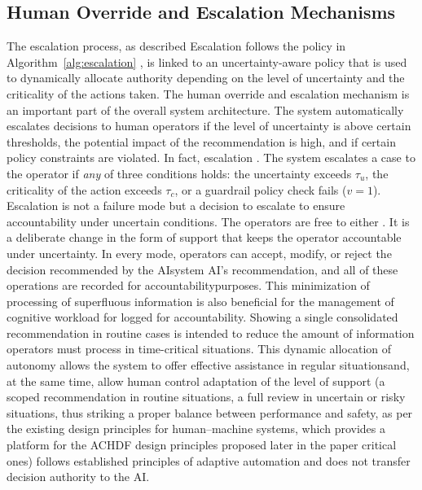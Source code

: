 \documentclass[journal]{IEEEtran}
\theoremstyle{plain}
\theoremstyle{definition}
\providecommand{\DIFaddtex}[1]{{\protect\color{blue} \sf #1}} %
\providecommand{\DIFdeltex}[1]{{\protect\color{red} \scriptsize #1}} %
\providecommand{\DIFaddbegin}{} %
\providecommand{\DIFaddend}{} %
\providecommand{\DIFdelbegin}{} %
\providecommand{\DIFdelend}{} %
\providecommand{\DIFadd}[1]{\texorpdfstring{\DIFaddtex{#1}}{#1}} %
\providecommand{\DIFdel}[1]{\texorpdfstring{\DIFdeltex{#1}}{}} %
\newcommand{\DIFscaledelfig}{0.5}
\newlength{\DIFdelgraphicswidth} %
\newlength{\DIFdelgraphicsheight} %
\newcommand{\DIFaddincludegraphics}[2][]{{\color{blue}\fbox{\DIFOincludegraphics[#1]{#2}}}} %
\newcommand{\DIFdelincludegraphics}[2][]{%
\sbox{\DIFdelgraphicsbox}{\DIFOincludegraphics[#1]{#2}}%
\settoboxwidth{\DIFdelgraphicswidth}{\DIFdelgraphicsbox} %
\settoboxtotalheight{\DIFdelgraphicsheight}{\DIFdelgraphicsbox} %
\scalebox{\DIFscaledelfig}{%
\parbox[b]{\DIFdelgraphicswidth}{\usebox{\DIFdelgraphicsbox}\\[-\baselineskip] \rule{\DIFdelgraphicswidth}{0em}}\llap{\resizebox{\DIFdelgraphicswidth}{\DIFdelgraphicsheight}{%
\setlength{\unitlength}{\DIFdelgraphicswidth}%
\begin{picture}(1,1)%
\thicklines\linethickness{2pt} %
{\color[rgb]{1,0,0}\put(0,0){\framebox(1,1){}}}%
{\color[rgb]{1,0,0}\put(0,0){\line( 1,1){1}}}%
{\color[rgb]{1,0,0}\put(0,1){\line(1,-1){1}}}%
\end{picture}%
}\hspace*{3pt}}} %
} %
\DeclareRobustCommand{\DIFaddbegin}{\DIFOaddbegin \let\includegraphics\DIFaddincludegraphics} %
\DeclareRobustCommand{\DIFaddend}{\DIFOaddend \let\includegraphics\DIFOincludegraphics} %
\DeclareRobustCommand{\DIFdelbegin}{\DIFOdelbegin \let\includegraphics\DIFdelincludegraphics} %
\DeclareRobustCommand{\DIFdelend}{\DIFOaddend \let\includegraphics\DIFOincludegraphics} %
\begin{document}
\subsection{Human Override and Escalation Mechanisms}
\DIFdelbegin \DIFdel{The escalation process, as described }\DIFdelend \DIFaddbegin \DIFadd{Escalation follows the policy }\DIFaddend in Algorithm~\ref{alg:escalation}\DIFdelbegin \DIFdel{, is linked to an uncertainty-aware policy that is used to dynamically allocate authority depending on the level of uncertainty and the criticality of the actions taken. The human override and escalation mechanism is an important part of the overall system architecture.
The system automatically escalates decisions to human operators if the level of uncertainty is above certain thresholds, the potential impact of the recommendation is high, and if certain policy constraints are violated. In fact, escalation }\DIFdelend \DIFaddbegin \DIFadd{. The system escalates a case to the operator if \emph{any} of three conditions holds: the uncertainty exceeds $\tau_u$, the criticality of the action exceeds $\tau_c$, or a guardrail policy check fails ($v=1$). Escalation }\DIFaddend is not a failure mode\DIFdelbegin \DIFdel{but a decision to escalate to ensure accountability under uncertain conditions.
The operators are free to either }\DIFdelend \DIFaddbegin \DIFadd{. It is a deliberate change in the form of support that keeps the operator accountable under uncertainty.
In every mode, operators can }\DIFaddend accept, modify, or reject the \DIFdelbegin \DIFdel{decision recommended by the AIsystem}\DIFdelend \DIFaddbegin \DIFadd{AI's recommendation}\DIFaddend , and all of these operations are \DIFdelbegin \DIFdel{recorded for accountabilitypurposes. This minimization of processing of superfluous information is also beneficial for the management of cognitive workload for }\DIFdelend \DIFaddbegin \DIFadd{logged for accountability. Showing a single consolidated recommendation in routine cases is intended to reduce the amount of information operators must process in }\DIFaddend time-critical situations.
This \DIFdelbegin \DIFdel{dynamic allocation of autonomy allows the system to offer effective assistance in regular situationsand, at the same time, allow human control }\DIFdelend \DIFaddbegin \DIFadd{adaptation of the level of support (a scoped recommendation in routine situations, a full review }\DIFaddend in uncertain or \DIFdelbegin \DIFdel{risky situations, thus striking a proper balance between performance and safety, as per the existing design principles for human--machine systems, which provides a platform for the ACHDF design principles proposed later in the paper}\DIFdelend \DIFaddbegin \DIFadd{critical ones) follows established principles of adaptive automation \cite{Parasuraman2000LOA,Scerbo2007} and does not transfer decision authority to the AI}\DIFaddend .
\end{document}
